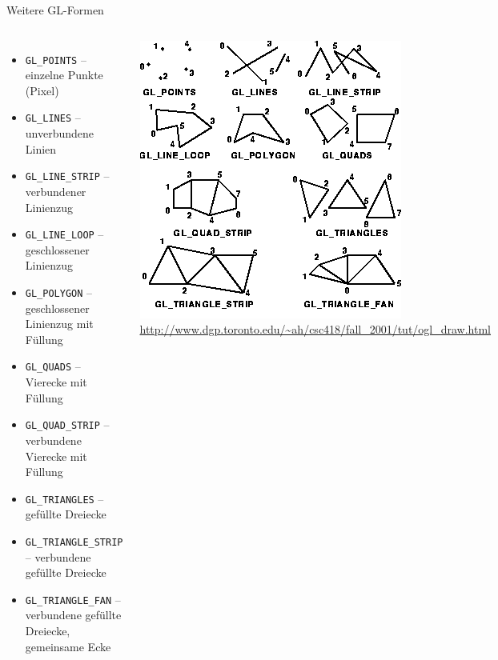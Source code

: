 \begin{frame}{Weitere GL-Formen}
%
\begin{columns}[T]
\begin{itemize}
\item \texttt{GL\_POINTS} -- einzelne Punkte (Pixel)
\item \texttt{GL\_LINES} -- unverbundene Linien
\item \texttt{GL\_LINE\_STRIP} -- verbundener Linienzug
\item \texttt{GL\_LINE\_LOOP} -- geschlossener Linienzug
\item \texttt{GL\_POLYGON} -- geschlossener Linienzug mit Füllung
\item \texttt{GL\_QUADS} -- Vierecke mit Füllung
\item \texttt{GL\_QUAD\_STRIP} -- verbundene Vierecke mit Füllung
\item \texttt{GL\_TRIANGLES} -- gefüllte Dreiecke
\item \texttt{GL\_TRIANGLE\_STRIP} -- verbundene gefüllte Dreiecke
\item \texttt{GL\_TRIANGLE\_FAN} -- verbundene gefüllte Dreiecke, gemeinsame Ecke
\end{itemize}
%
\includegraphics[width=\linewidth]{./gfx/GL-prims}\\
{\tiny\url{http://www.dgp.toronto.edu/~ah/csc418/fall_2001/tut/ogl_draw.html}}\\
\end{columns}
%
\end{frame}

